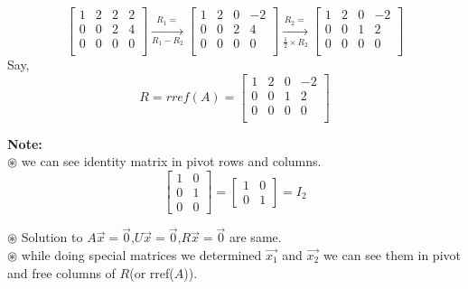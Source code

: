 \documentclass[a4paper,11pt]{article}
\numberwithin{equation}{section}
\begin{document}
\begin{itemize}
\begin{center}
    \[
        \begin{bmatrix}
            1&2&2&2\\
            0&0&2&4\\
            0&0&0&0\\
        \end{bmatrix}\xrightarrow[R_1-R_2]{R_1=}
        \begin{bmatrix}
            1&2&0&-2\\
            0&0&2&4\\
            0&0&0&0\\
        \end{bmatrix}\xrightarrow[\frac{1}{2}\times R_2]{R_2=}
        \begin{bmatrix}
            1&2&0&-2\\
            0&0&1&2\\
            0&0&0&0\\
        \end{bmatrix}
    \]
Say,
    \begin{equation}
        R=rref(A)=
        \begin{bmatrix}
            1&2&0&-2\\
            0&0&1&2\\
            0&0&0&0\\
        \end{bmatrix}
    \end{equation}
\end{center}

\textbf{Note: }\\
\textbf{$\circledast$ } we can see identity matrix in pivot rows and columns.
\begin{equation}
    \begin{bmatrix}
        1&0\\0&1\\0&0
    \end{bmatrix}=
    \begin{bmatrix}
        1&0\\0&1
    \end{bmatrix}=
    I_2
\end{equation}

\textbf{$\circledast$ }Solution to $A\vec{x}=\vec{0}$,$U\vec{x}=\vec{0}$,$R\vec{x}=\vec{0}$ are same.\\
\textbf{$\circledast$ }while doing special matrices we determined $\vec{x_1}$ and $\vec{x_2}$ we can see them in pivot and free columns of $R$(or rref($A$)).\\


\end{itemize}
\end{document}
